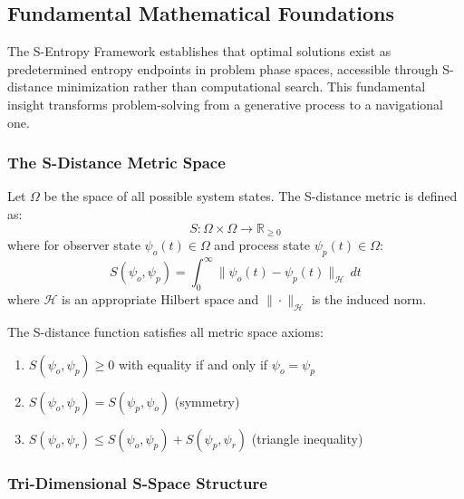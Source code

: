 ﻿\documentclass[11pt,a4paper]{article}
\begin{document}
\subsection{Fundamental Mathematical Foundations}

The S-Entropy Framework establishes that optimal solutions exist as predetermined entropy endpoints in problem phase spaces, accessible through S-distance minimization rather than computational search. This fundamental insight transforms problem-solving from a generative process to a navigational one.

\subsubsection{The S-Distance Metric Space}

\begin{definition}
Let $\Omega$ be the space of all possible system states. The S-distance metric is defined as:
\begin{equation}
S: \Omega \times \Omega \to \mathbb{R}_{\geq 0}
\end{equation}
where for observer state $\psi_o(t) \in \Omega$ and process state $\psi_p(t) \in \Omega$:
\begin{equation}
S(\psi_o, \psi_p) = \int_0^{\infty} \|\psi_o(t) - \psi_p(t)\|_{\mathcal{H}} \, dt
\label{eq:s_distance}
\end{equation}
where $\mathcal{H}$ is an appropriate Hilbert space and $\|\cdot\|_{\mathcal{H}}$ is the induced norm.
\end{definition}

\begin{theorem}
The S-distance function satisfies all metric space axioms:
\begin{enumerate}
\item $S(\psi_o, \psi_p) \geq 0$ with equality if and only if $\psi_o = \psi_p$
\item $S(\psi_o, \psi_p) = S(\psi_p, \psi_o)$ (symmetry)
\item $S(\psi_o, \psi_r) \leq S(\psi_o, \psi_p) + S(\psi_p, \psi_r)$ (triangle inequality)
\end{enumerate}
\end{theorem}

\subsubsection{Tri-Dimensional S-Space Structure}
\end{document}
